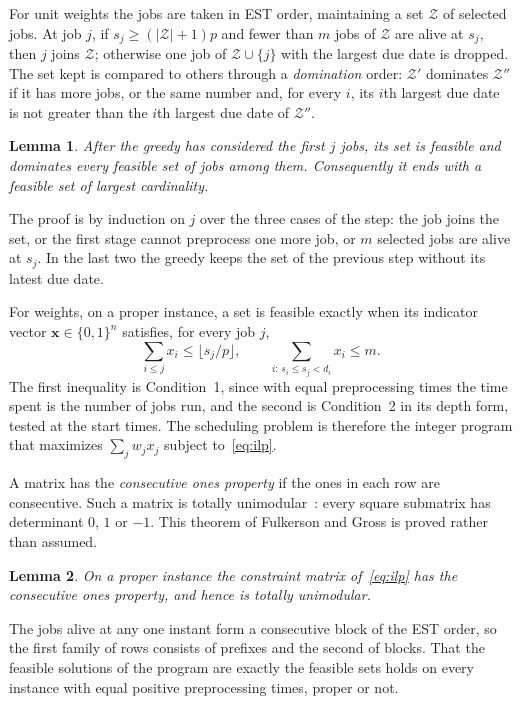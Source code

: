 \documentclass[11pt,a4paper]{article}
\newtheorem{lemma}{Lemma}
\theoremstyle{definition}
\theoremstyle{plain}
\newcommand{\calZ}{\mathcal{Z}}
\begin{document}
For unit weights the jobs are taken in EST order, maintaining a set $\calZ$ of selected jobs. At
job $j$, if $s_j\ge(|\calZ|+1)p$ and fewer than $m$ jobs of $\calZ$ are alive at $s_j$, then $j$
joins $\calZ$; otherwise one job of $\calZ\cup\{j\}$ with the largest due date is dropped. The
set kept is compared to others through a \emph{domination} order: $\calZ'$ dominates $\calZ''$
if it has more jobs, or the same number and, for every $i$, its $i$th largest due date is not
greater than the $i$th largest due date of $\calZ''$.

\begin{lemma}\label{lem:greedy}
After the greedy has considered the first $j$ jobs, its set is feasible and dominates every
feasible set of jobs among them. Consequently it ends with a feasible set of largest
cardinality.
\end{lemma}
The proof is by induction on $j$ over the three cases of the step: the job joins the set, or the
first stage cannot preprocess one more job, or $m$ selected jobs are alive at $s_j$. In the last
two the greedy keeps the set of the previous step without its latest due date.

For weights, on a proper instance, a set is feasible exactly when its indicator vector
$\mathbf x\in\{0,1\}^n$ satisfies, for every job $j$,
\begin{equation}\label{eq:ilp}
\sum_{i\le j}x_i\le\lfloor s_j/p\rfloor,\qquad\sum_{i:\,s_i\le s_j<d_i}x_i\le m.
\end{equation}
The first inequality is Condition~1, since with equal preprocessing times the time spent is the
number of jobs run, and the second is Condition~2 in its depth form, tested at the start times.
The scheduling problem is therefore the integer program that maximizes $\sum_jw_jx_j$ subject
to~\eqref{eq:ilp}.

A matrix has the \emph{consecutive ones property} if the ones in each row are consecutive. Such
a matrix is totally unimodular~\cite{FG65}: every square submatrix has determinant $0$, $1$ or
$-1$.
This theorem of Fulkerson and Gross is proved rather than assumed.

\begin{lemma}\label{lem:ilp}
On a proper instance the constraint matrix of~\eqref{eq:ilp} has the consecutive ones
property, and hence is totally unimodular.
\end{lemma}
The jobs alive at any one instant form a consecutive block of the EST order, so the first family
of rows consists of prefixes and the second of blocks. That the feasible solutions of the program
are exactly the feasible sets holds on every instance with equal positive preprocessing times,
proper or not.
\end{document}
